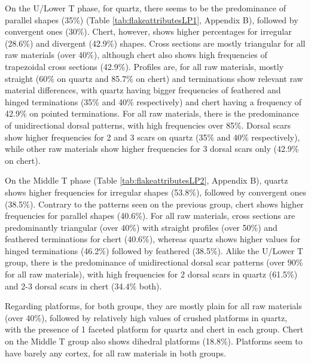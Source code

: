 \documentclass[12pt,twoside]{reedthesis}
\begin{document}
On the U/Lower T phase, for quartz, there seems to be the predominance of parallel shapes (35\%) (Table \ref{tab:flakeattributesLP1}, Appendix B), followed by convergent ones (30\%). Chert, however, shows higher percentages for irregular (28.6\%) and divergent (42.9\%) shapes. Cross sections are mostly triangular for all raw materials (over 40\%), although chert also shows high frequencies of trapezoidal cross sections (42.9\%). Profiles are, for all raw materials, mostly straight (60\% on quartz and 85.7\% on chert) and terminations show relevant raw material differences, with quartz having bigger frequencies of feathered and hinged terminations (35\% and 40\% respectively) and chert having a frequency of 42.9\% on pointed terminations. For all raw materials, there is the predominance of unidirectional dorsal patterns, with high frequencies over 85\%. Dorsal scars show higher frequencies for 2 and 3 scars on quartz (35\% and 40\% respectively), while other raw materials show higher frequencies for 3 dorsal scars only (42.9\% on chert).

On the Middle T phase (Table \ref{tab:flakeattributesLP2}, Appendix B), quartz shows higher frequencies for irregular shapes (53.8\%), followed by convergent ones (38.5\%). Contrary to the patterns seen on the previous group, chert shows higher frequencies for parallel shapes (40.6\%). For all raw materials, cross sections are predominantly triangular (over 40\%) with straight profiles (over 50\%) and feathered terminations for chert (40.6\%), whereas quartz shows higher values for hinged terminations (46.2\%) followed by feathered (38.5\%). Alike the U/Lower T group, there is the predominance of unidirectional dorsal scar patterns (over 90\% for all raw materials), with high frequencies for 2 dorsal scars in quartz (61.5\%) and 2-3 dorsal scars in chert (34.4\% both).

Regarding platforms, for both groups, they are mostly plain for all raw materials (over 40\%), followed by relatively high values of crushed platforms in quartz, with the presence of 1 faceted platform for quartz and chert in each group. Chert on the Middle T group also shows dihedral platforms (18.8\%). Platforms seem to have barely any cortex, for all raw materials in both groups.
\end{document}
